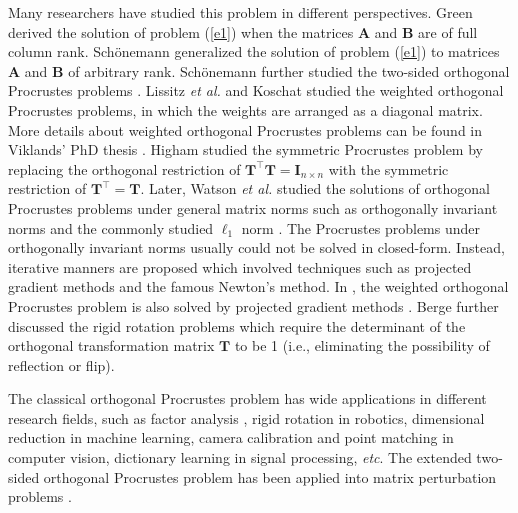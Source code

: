 \documentclass[titlepage,11pt,twoside]{article}
\begin{document}
Many researchers have studied this problem in different perspectives. Green \cite{green1952orthogonal} derived the solution of problem (\ref{e1}) when the matrices $\mathbf{A}$ and $\mathbf{B}$ are of full column rank. Sch{\"o}nemann \cite{schonemann1966generalized} generalized the solution of problem (\ref{e1}) to matrices $\mathbf{A}$ and $\mathbf{B}$ of arbitrary rank. Sch{\"o}nemann further studied the two-sided orthogonal Procrustes problems \cite{schonemann1968two}. Lissitz \emph{et al.} \cite{Lissitz1976} and Koschat \cite{Koschat1991} studied the weighted orthogonal Procrustes problems, in which the weights are arranged as a diagonal matrix. More details about weighted orthogonal Procrustes problems can be found in Viklands' PhD thesis \cite{viklands2006algorithms}. Higham \cite{higham1988symmetric} studied the symmetric Procrustes problem by replacing the orthogonal restriction of $\mathbf{T}^{\top}\mathbf{T}=\mathbf{I}_{n\times n}$ with the symmetric restriction of $\mathbf{T}^{\top}=\mathbf{T}$. Later, Watson \emph{et al.} studied the solutions of orthogonal Procrustes problems under general matrix norms such as orthogonally invariant norms \cite{Watson1994} and the commonly studied $\ell_{1}$ norm \cite{trendafilov2004l1}. The Procrustes problems under orthogonally invariant norms usually could not be solved in closed-form. Instead, iterative manners are proposed which involved techniques such as projected gradient methods \cite{chu1990projected} and the famous Newton's method. In \cite{trendafilov2004l1}, the weighted orthogonal Procrustes problem is also solved by projected gradient methods \cite{chu1990projected}. Berge \cite{Berge2006} further discussed the rigid rotation problems which require the determinant of the orthogonal transformation matrix $\mathbf{T}$ to be 1 (i.e., eliminating the possibility of reflection or flip).

The classical orthogonal Procrustes problem \cite{procrustesprogram} has wide applications in different research fields, such as factor analysis \cite{green1952orthogonal}, rigid rotation \cite{Berge2006} in robotics, dimensional reduction \cite{zou2006sparse} in machine learning, camera calibration \cite{zhang2000flexible} and point matching \cite{pointpatterns} in computer vision, dictionary learning \cite{aharon2006img} in signal processing, \emph{etc}. The extended two-sided orthogonal Procrustes problem has been applied into matrix perturbation problems \cite{schonemann1968two}.
\end{document}
